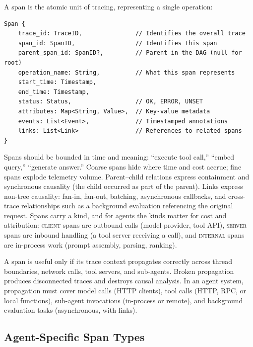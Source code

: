 \documentclass[11pt]{book}
\begin{document}
A span is the atomic unit of tracing, representing a single operation:

{\footnotesize
\begin{verbatim}
Span {
    trace_id: TraceID,               // Identifies the overall trace
    span_id: SpanID,                 // Identifies this span
    parent_span_id: SpanID?,         // Parent in the DAG (null for root)
    operation_name: String,          // What this span represents
    start_time: Timestamp,
    end_time: Timestamp,
    status: Status,                  // OK, ERROR, UNSET
    attributes: Map<String, Value>,  // Key-value metadata
    events: List<Event>,             // Timestamped annotations
    links: List<Link>                // References to related spans
}
\end{verbatim}
}

Spans should be bounded in time and meaning: ``execute tool call,'' ``embed query,'' ``generate answer.'' Coarse spans hide where time and cost accrue; fine spans explode telemetry volume. Parent--child relations express containment and synchronous causality (the child occurred as part of the parent). Links express non-tree causality: fan-in, fan-out, batching, asynchronous callbacks, and cross-trace relationships such as a background evaluation referencing the original request. Spans carry a kind, and for agents the kinds matter for cost and attribution: \textsc{client} spans are outbound calls (model provider, tool API), \textsc{server} spans are inbound handling (a tool server receiving a call), and \textsc{internal} spans are in-process work (prompt assembly, parsing, ranking).

A span is useful only if its trace context propagates correctly across thread boundaries, network calls, tool servers, and sub-agents. Broken propagation produces disconnected traces and destroys causal analysis. In an agent system, propagation must cover model calls (HTTP clients), tool calls (HTTP, RPC, or local functions), sub-agent invocations (in-process or remote), and background evaluation tasks (asynchronous, with links).

\subsection{Agent-Specific Span Types}
\end{document}
